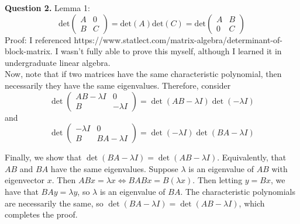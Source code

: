 \documentclass{article}
\begin{document}
\textbf{Question 2.} Lemma 1: 
\begin{equation*}
    \text{det}\begin{pmatrix}
        A&0\\
        B&C
    \end{pmatrix} = \text{det}(A)\text{det}(C) = \text{det}\begin{pmatrix}
        A&B\\
        0&C
    \end{pmatrix}
\end{equation*} 
Proof: I referenced https://www.statlect.com/matrix-algebra/determinant-of-block-matrix. I wasn't fully able to prove this myself, although I learned it in undergraduate linear algebra. \\

Now, note that if two matrices have the same characteristic polynomial, then necessarily they have the same eigenvalues. Therefore, consider 
\begin{equation*}
    \det \begin{pmatrix}
        AB-\lambda I&0\\
        B & -\lambda I
    \end{pmatrix} = \det(AB-\lambda I)\det(-\lambda I)
\end{equation*}
and 
\begin{equation*}
    \det \begin{pmatrix}
        -\lambda I & 0 \\
        B&BA-\lambda I
    \end{pmatrix} = \det(-\lambda I)\det(BA-\lambda I)
\end{equation*}

Finally, we show that $\det(BA-\lambda I) = \det(AB-\lambda I)$. Equivalently, that $AB$ and $BA$ have the same eigenvalues. Suppose $\lambda$ is an eigenvalue of $AB$ with eigenvector $x$. Then $AB x= \lambda x \iff BAB x= B(\lambda x)$. Then letting $y=Bx$, we have that $BA y = \lambda y$, so $\lambda$ is an eigenvalue of $BA$. The characteristic polynomials are necessarily the same, so $\det(BA-\lambda I) = \det(AB-\lambda I)$, which completes the proof. \\
\end{document}
